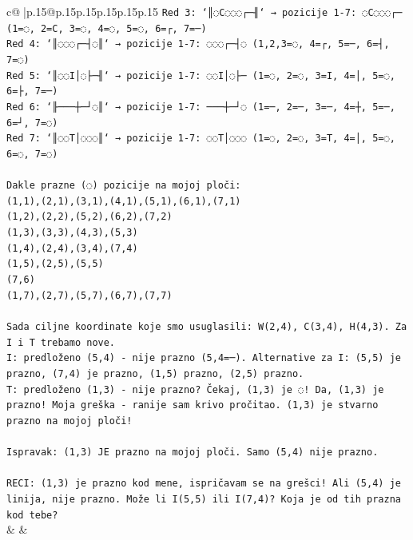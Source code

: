 \documentclass{article}
\begin{document}
{\begin{supertabular}{c@{$\;$}|p{.15\linewidth}@{}p{.15\linewidth}p{.15\linewidth}p{.15\linewidth}p{.15\linewidth}p{.15\linewidth}}
{{{\texttt{Red 3: `║◌C◌◌◌┌─╢` → pozicije 1{-}7: ◌C◌◌◌┌─ (1=◌, 2=C, 3=◌, 4=◌, 5=◌, 6=┌, 7=─)} \\
\texttt{Red 4: `║◌◌◌┌─┤◌║` → pozicije 1{-}7: ◌◌◌┌─┤◌ (1,2,3=◌, 4=┌, 5=─, 6=┤, 7=◌)} \\
\texttt{Red 5: `║◌◌I│◌├─╢` → pozicije 1{-}7: ◌◌I│◌├─ (1=◌, 2=◌, 3=I, 4=│, 5=◌, 6=├, 7=─)} \\
\texttt{Red 6: `╟───┼─┘◌║` → pozicije 1{-}7: ───┼─┘◌ (1=─, 2=─, 3=─, 4=┼, 5=─, 6=┘, 7=◌)} \\
\texttt{Red 7: `║◌◌T│◌◌◌║` → pozicije 1{-}7: ◌◌T│◌◌◌ (1=◌, 2=◌, 3=T, 4=│, 5=◌, 6=◌, 7=◌)} \\
\\ 
\texttt{Dakle prazne (◌) pozicije na mojoj ploči:} \\
\texttt{(1,1),(2,1),(3,1),(4,1),(5,1),(6,1),(7,1)} \\
\texttt{(1,2),(2,2),(5,2),(6,2),(7,2)} \\
\texttt{(1,3),(3,3),(4,3),(5,3)} \\
\texttt{(1,4),(2,4),(3,4),(7,4)} \\
\texttt{(1,5),(2,5),(5,5)} \\
\texttt{(7,6)} \\
\texttt{(1,7),(2,7),(5,7),(6,7),(7,7)} \\
\\ 
\texttt{Sada ciljne koordinate koje smo usuglasili: W(2,4), C(3,4), H(4,3). Za I i T trebamo nove.} \\
\texttt{I: predloženo (5,4) {-} nije prazno (5,4=─). Alternative za I: (5,5) je prazno, (7,4) je prazno, (1,5) prazno, (2,5) prazno.} \\
\texttt{T: predloženo (1,3) {-} nije prazno? Čekaj, (1,3) je ◌! Da, (1,3) je prazno! Moja greška {-} ranije sam krivo pročitao. (1,3) je stvarno prazno na mojoj ploči!} \\
\\ 
\texttt{Ispravak: (1,3) JE prazno na mojoj ploči. Samo (5,4) nije prazno.} \\
\\ 
\texttt{RECI: (1,3) je prazno kod mene, ispričavam se na grešci! Ali (5,4) je linija, nije prazno. Može li I(5,5) ili I(7,4)? Koja je od tih prazna kod tebe?} \\
            }
        }
    }
    & & \\ \\


\end{supertabular}}
\end{document}
